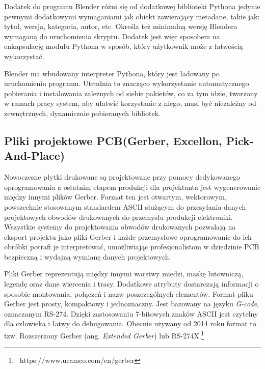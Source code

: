 \documentclass[brudnopis]{xmgr}
\begin{document}
Dodatek do programu Blender różni się od dodatkowej biblioteki Pythona jedynie pewnymi dodatkowymi wymaganiami jak obiekt zawierający metadane, takie jak: tytuł, wersja, kategoria, autor, etc. Określa też minimalną wersję Blendera wymaganą do uruchomienia skryptu. Dodatek jest więc sposobem na enkapsulację modułu Pythona w sposób, który użytkownik może z łatwością wykorzystać.

Blender ma wbudowany interpreter Pythona, który jest ładowany po uruchomieniu programu. Utrudnia to znacząco wykorzystanie automatycznego pobierania i instalowania zależnych od siebie pakietów, co za tym idzie, tworzony w ramach pracy system, aby ułatwić korzystanie z niego, musi być niezależny od zewnętrznych, dynamicznie pobieranych bibliotek.



\subsection{Pliki projektowe PCB\newline(Gerber, Excellon, Pick-And-Place)}

Nowoczesne płytki drukowane są projektowane przy pomocy dedykowanego oprogramowania a ostatnim etapem produkcji dla projektanta jest wygenerowanie między innymi plików Gerber.\cite{Khandpur}
Format ten jest otwartym, wektorowym, powszechnie stosowanym standardem ASCII służącym do przesyłania danych projektowych obwodów drukowanych do przemysłu produkcji elektroniki. Wszystkie systemy do projektowania obwodów drukowanych pozwalają na eksport projektu jako pliki Gerber i każde przemysłowe oprogramowanie do ich obróbki potrafi je interpretować, umożliwiając profesjonalistom w dziedzinie PCB bezpieczną i wydajną wymianę danych projektowych.\cite{Williams}

Pliki Gerber reprezentują między innymi warstwy miedzi, maskę lutowniczą, legendę oraz dane wiercenia i trasy. Dodatkowe atrybuty dostarczają informacji o sposobie montowania, połączeń i nazw poszczególnych elementów. Format pliku Gerber jest prosty, kompaktowy i jednoznaczny. Jest bazowany na języku \emph{G-code}, oznaczanym RS-274. Dzięki zastosowaniu 7-bitowych znaków ASCII jest czytelny dla człowieka i łatwy do debugowania. Obecnie używany od 2014 roku format to tzw. Rozszerzony Gerber (ang. \emph{Extended Gerber}) lub RS-274X.\footnote{~https://www.ucamco.com/en/gerber}
\end{document}
